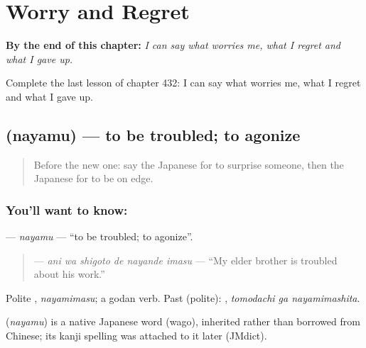 
\chapter{Worry and Regret}
\label{ch:ja-worry-and-regret}

\begin{chapteropening}
\textbf{By the end of this chapter:} \emph{I can say what worries me, what I regret and what I gave up.}

Complete the last lesson of chapter 432: I can say what worries me, what I regret and what I gave up.
\end{chapteropening}

\section[\texorpdfstring{\ja{なやむ} (nayamu)}{なやむ (nayamu)}]{ (nayamu) — to be troubled; to agonize}

\label{lesson:JA-C432-nayamu}



\begin{quote}
Before the new one: say the Japanese for to surprise someone, then the Japanese for to be on edge.
\end{quote}

\subsection*{You'll want to know: }
\textbf{} — \emph{nayamu} — \textquotedblleft{}to be troubled; to agonize\textquotedblright{}.

\begin{quote}
\textbf{  } — \emph{ani wa shigoto de nayande imasu} — \textquotedblleft{}My elder brother is troubled about his work.\textquotedblright{}
\end{quote}

Polite \textbf{}, \emph{nayamimasu}; a godan verb. Past (polite): \textbf{ }, \emph{tomodachi ga nayamimashita}.

\begin{cousinweb}
\textbf{} (\emph{nayamu}) is a native Japanese word (wago), inherited rather than borrowed from Chinese; its kanji spelling was attached to it later (JMdict).
\end{cousinweb}

